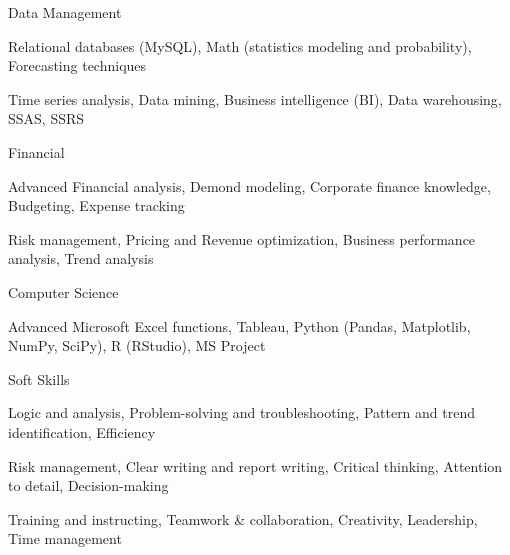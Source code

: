 \documentclass[11pt, a4paper]{awesome-cv}
\begin{document}
\begin{cvskills}

  \cvskill
    {Data Management} %
    {
      \begin{cvitems}
        \item {Relational databases (MySQL), Math (statistics modeling and probability), Forecasting techniques}
        \item {Time series analysis, Data mining, Business intelligence (BI), Data warehousing, SSAS, SSRS}
      \end{cvitems}
    }

  \cvskill
    {Financial} %
    {
      \begin{cvitems}
        \item {Advanced Financial analysis, Demond modeling, Corporate finance knowledge, Budgeting, Expense tracking}
        \item {Risk management, Pricing and Revenue optimization, Business performance analysis, Trend analysis}
      \end{cvitems}
    }

  \cvskill
    {Computer Science} %
    {
      \begin{cvitems} %
        \item {Advanced Microsoft Excel functions, Tableau, Python (Pandas, Matplotlib, NumPy, SciPy), R (RStudio), MS Project}
      \end{cvitems}
    }

  \cvskill
    {Soft Skills} %
    {
      \begin{cvitems} %
        \item {Logic and analysis, Problem-solving and troubleshooting, Pattern and trend identification, Efficiency}
        \item {Risk management, Clear writing and report writing, Critical thinking, Attention to detail, Decision-making}
        \item {Training and instructing, Teamwork \& collaboration, Creativity, Leadership, Time management}
      \end{cvitems}
    }

\end{cvskills}
\end{document}
